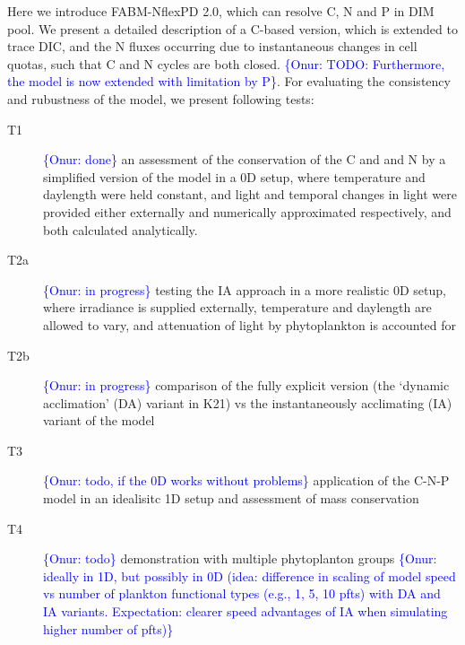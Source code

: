 \documentclass[gmd, manuscript, draft]{copernicus}
\newcommand{\onur}[1]{\textcolor{blue}{\{Onur: #1\}}}
\begin{document}
Here we introduce FABM-NflexPD 2.0, which can resolve C, N and P in DIM pool. We present a detailed description of a C-based version, which is extended to trace DIC, and the N fluxes occurring due to instantaneous changes in cell quotas, such that C and N cycles are both closed. \onur{TODO: Furthermore, the model is now extended with limitation by P}. For evaluating the consistency and rubustness of the model, we present following tests:
\begin{description}
 \item [T1] \onur{done} an assessment of the conservation of the C and and N by a simplified version of the model in a 0D setup, where temperature and daylength were held constant, and light and temporal changes in light were provided either externally and numerically approximated respectively, and both calculated analytically.
 \item [T2a] \onur{in progress} testing the IA approach in a more realistic 0D setup, where irradiance is supplied externally, temperature and daylength are allowed to vary, and attenuation of light by phytoplankton is accounted for
 \item [T2b] \onur{in progress} comparison of the fully explicit version (the `dynamic acclimation' (DA) variant in K21) vs the instantaneously acclimating (IA) variant of the model 
 \item [T3] \onur{todo, if the 0D works without problems} application of the C-N-P model in an idealisitc 1D setup and assessment of mass conservation
 \item [T4] \onur{todo} demonstration with multiple phytoplanton groups \onur{ideally in 1D, but possibly in 0D (idea: difference in scaling of model speed vs number of plankton functional types (e.g., 1, 5, 10 pfts) with DA and IA variants. Expectation: clearer speed advantages of IA when simulating higher number of pfts)}
\end{description}
\end{document}
